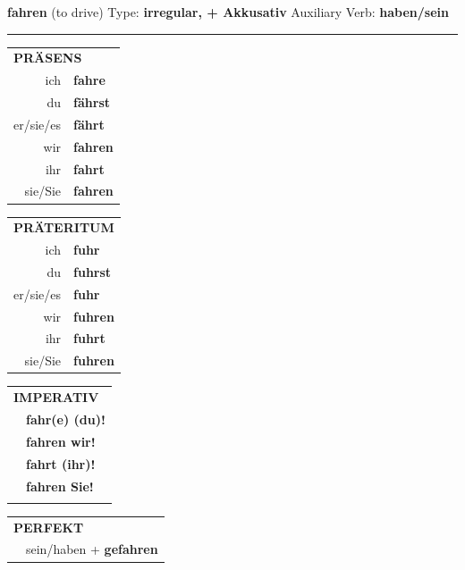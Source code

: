 \documentclass[10pt,a4paper]{revtex4-2}
\begin{document}
\begin{verbbox-acc}
    {\Large \bf fahren} (to drive) \hfill Type: \textbf{irregular, + Akkusativ} \hfill Auxiliary Verb: \textbf{haben/sein} 
    
     \vspace{5pt}

    \hrule
    
    \vspace{5pt}

  \begin{tabular}{rl}
     \multicolumn{2}{l}{\textbf{PRÄSENS} }\\
    ich & \textbf{fahre}\\
    du & \textbf{f\"ahrst}\\
    er/sie/es & \textbf{f\"ahrt}\\
    wir & \textbf{fahren}\\
    ihr & \textbf{fahrt}\\
    sie/Sie & \textbf{fahren}\\
  \end{tabular}
  \hfill
     \begin{tabular}{rl}
    \multicolumn{2}{l}{\textbf{PRÄTERITUM} }\\
    ich & \textbf{fuhr}\\
    du & \textbf{fuhrst}\\
    er/sie/es & \textbf{fuhr}\\
    wir & \textbf{fuhren}\\
    ihr & \textbf{fuhrt}\\
    sie/Sie & \textbf{fuhren}\\
  \end{tabular}
  \hfill
  \begin{tabular}{rl}
     \multicolumn{2}{l}{\textbf{IMPERATIV} }\\
   & \textbf{fahr(e) (du)!}\\
   & \textbf{fahren wir!}\\
   & \textbf{fahrt (ihr)!}\\
   & \textbf{fahren Sie!}\\
   & \vspace{10pt}
  \end{tabular}

    \vspace{10pt}

 \begin{tabular}{rl}
     \multicolumn{2}{l}{\textbf{PERFEKT}}\\
  &  sein/haben + \textbf{gefahren}\\
  \end{tabular}
\hfill
   \begin{tabular}{rl}
   

\end{tabular}
\end{verbbox-acc}
\end{document}
